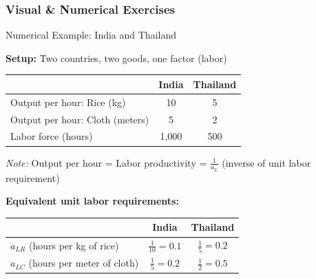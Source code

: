 \documentclass{beamer}
\begin{document}

\subsubsection{Visual \& Numerical Exercises}


\begin{frame}{Numerical Example: India and Thailand}

\textbf{Setup:} Two countries, two goods, one factor (labor)

\vspace{0.1cm}

\begin{center}
\begin{tabular}{lcc}
\toprule
& \textbf{India} & \textbf{Thailand} \\
\midrule
Output per hour: Rice (kg) & 10 & 5 \\
Output per hour: Cloth (meters) & 5 & 2 \\
\midrule
Labor force (hours) & 1,000 & 500 \\
\bottomrule
\end{tabular}
\end{center}

\vspace{0.3cm}

\textit{Note:} Output per hour = Labor productivity = $\frac{1}{a_L}$ (inverse of unit labor requirement)

\vspace{0.3cm}

\textbf{Equivalent unit labor requirements:}

\begin{center}
\begin{tabular}{lcc}
\toprule
& \textbf{India} & \textbf{Thailand} \\
\midrule
$a_{LR}$ (hours per kg of rice) & $\frac{1}{10} = 0.1$ & $\frac{1}{5} = 0.2$ \\
$a_{LC}$ (hours per meter of cloth) & $\frac{1}{5} = 0.2$ & $\frac{1}{2} = 0.5$ \\
\bottomrule
\end{tabular}
\end{center}

\end{frame}
\end{document}
